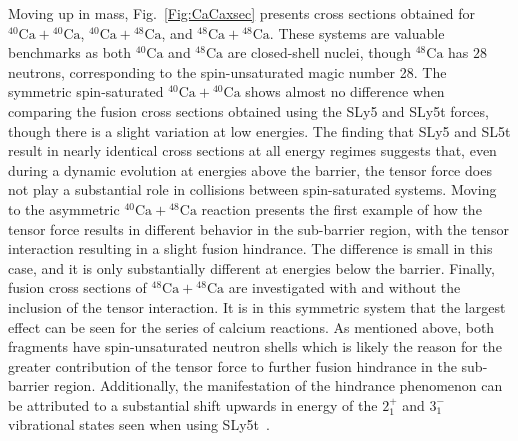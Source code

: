 Moving up in mass, Fig.~\ref{Fig:CaCaxsec} presents cross sections obtained for $^{40}\mathrm{Ca}+\mathrm{^{40}Ca}$, $^{40}\mathrm{Ca}+\mathrm{^{48}Ca}$, and $^{48}\mathrm{Ca}+\mathrm{^{48}Ca}$.
These systems are valuable benchmarks as both $^{40}\mathrm{Ca}$ and $\mathrm{^{48}Ca}$ are closed-shell nuclei, though $\mathrm{^{48}Ca}$ has $28$ neutrons, corresponding to the spin-unsaturated magic number 28.
The symmetric spin-saturated $^{40}\mathrm{Ca}+\mathrm{^{40}Ca}$ shows almost no difference when comparing the fusion cross sections obtained using the SLy5 and SLy5t forces, though there is a slight variation at low energies.
The finding that SLy5 and SL5t result in nearly identical cross sections at all energy regimes suggests that, even during a dynamic evolution at energies above the barrier, the tensor force does not play a substantial role in collisions between spin-saturated systems.
Moving to the asymmetric $^{40}\mathrm{Ca}+\mathrm{^{48}Ca}$ reaction presents the first example of how the tensor force results in different behavior in the sub-barrier region, with the tensor interaction resulting in a slight fusion hindrance.
The difference is small in this case, and it is only substantially different at energies below the barrier.
Finally, fusion cross sections of $^{48}\mathrm{Ca}+\mathrm{^{48}Ca}$ are investigated with and without the inclusion of the tensor interaction.
It is in this symmetric system that the largest effect can be seen for the series of calcium reactions.
As mentioned above, both fragments have spin-unsaturated neutron shells which is likely the reason for the greater contribution of the tensor force to further fusion hindrance in the sub-barrier region.
Additionally, the manifestation of the hindrance phenomenon can be attributed to a substantial shift upwards in energy of the $2^+_1$ and $3^-_1$ vibrational states seen when using SLy5t~\citep{guo2018}.

